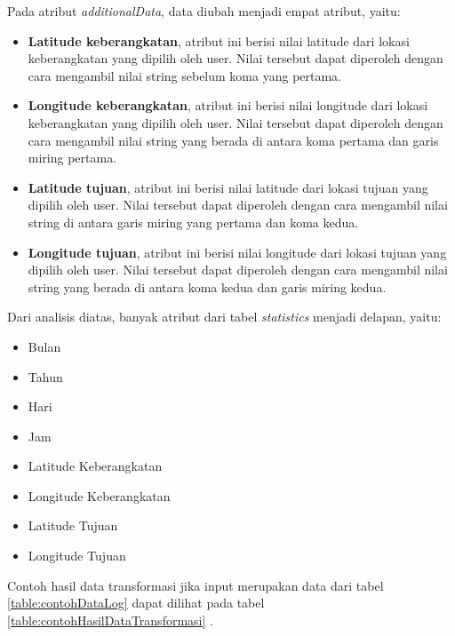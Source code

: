 Pada atribut \textsl{additionalData}, data diubah menjadi empat atribut, yaitu:
\begin{itemize}
	\item \textbf{Latitude keberangkatan}, atribut ini berisi nilai latitude dari lokasi keberangkatan yang dipilih oleh user. Nilai tersebut dapat diperoleh dengan cara mengambil nilai string sebelum koma yang pertama.
	\item \textbf{Longitude keberangkatan}, atribut ini berisi nilai longitude dari lokasi keberangkatan yang dipilih oleh user. Nilai tersebut dapat diperoleh dengan cara mengambil nilai string yang berada di antara koma pertama dan garis miring pertama.
	\item \textbf{Latitude tujuan}, atribut ini berisi nilai latitude dari lokasi tujuan yang dipilih oleh user. Nilai tersebut dapat diperoleh dengan cara mengambil nilai string di antara garis miring yang pertama dan koma kedua.
	\item \textbf{Longitude tujuan}, atribut ini berisi nilai longitude dari lokasi tujuan yang dipilih oleh user. Nilai tersebut dapat diperoleh dengan cara mengambil nilai string yang berada di antara koma kedua dan garis miring kedua.
\end{itemize}

Dari analisis diatas, banyak atribut dari tabel \textsl{statistics} menjadi delapan, yaitu:
\begin{itemize}
	\item Bulan
	\item Tahun
	\item Hari
	\item Jam
	\item Latitude Keberangkatan
	\item Longitude Keberangkatan
	\item Latitude Tujuan
	\item Longitude Tujuan
\end{itemize}

Contoh hasil data transformasi jika input merupakan data dari tabel \ref{table:contohDataLog} dapat dilihat pada tabel \ref{table:contohHasilDataTransformasi}	.


